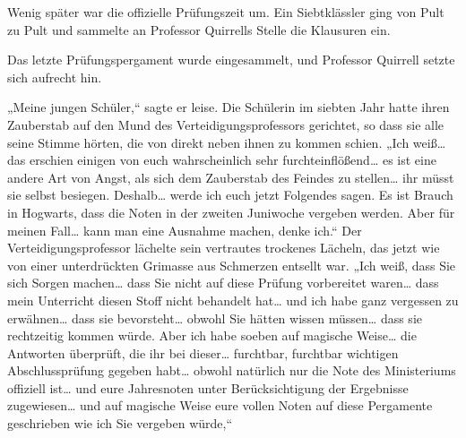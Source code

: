 Wenig später war die offizielle Prüfungszeit um. Ein Siebtklässler ging von Pult zu Pult und sammelte an Professor Quirrells Stelle die Klausuren ein.

Das letzte Prüfungspergament wurde eingesammelt, und Professor Quirrell setzte sich aufrecht hin.

„Meine jungen Schüler,“ sagte er leise.
Die Schülerin im siebten Jahr hatte ihren Zauberstab auf den Mund des Verteidigungsprofessors gerichtet, so dass sie alle seine Stimme hörten, die von direkt neben ihnen zu kommen schien.
„Ich weiß… das erschien einigen von euch wahrscheinlich sehr furchteinflößend… es ist eine andere Art von Angst, als sich dem Zauberstab des Feindes zu stellen… ihr müsst sie selbst besiegen. Deshalb… werde ich euch jetzt Folgendes sagen. Es ist Brauch in Hogwarts, dass die Noten in der zweiten Juniwoche vergeben werden. Aber für meinen Fall… kann man eine Ausnahme machen, denke ich.“
Der Verteidigungsprofessor lächelte sein vertrautes trockenes Lächeln, das jetzt wie von einer unterdrückten Grimasse aus Schmerzen entsellt war.
„Ich weiß, dass Sie sich Sorgen machen… dass Sie nicht auf diese Prüfung vorbereitet waren… dass mein Unterricht diesen Stoff nicht behandelt hat… und ich habe ganz vergessen zu erwähnen… dass sie bevorsteht… obwohl Sie hätten wissen müssen… dass sie rechtzeitig kommen würde. Aber ich habe soeben auf magische Weise… die Antworten überprüft, die ihr bei dieser… furchtbar, furchtbar wichtigen Abschlussprüfung gegeben habt… obwohl natürlich nur die Note des Ministeriums offiziell ist… und eure Jahresnoten unter Berücksichtigung der Ergebnisse zugewiesen… und auf magische Weise eure vollen Noten auf diese Pergamente geschrieben wie ich Sie vergeben würde,“
